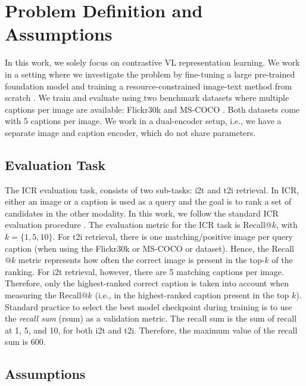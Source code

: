 
\section{Problem Definition and Assumptions}
\label{appendix:problem}

In this work, we solely focus on contrastive \ac{VL} representation learning. 
We work in a setting where we investigate the problem by fine-tuning a large pre-trained foundation model \citep[CLIP,][]{radford2021learning} and training a resource-constrained image-text method from scratch \citep[VSE++,][]{faghri2018improving}.
We train and evaluate using two benchmark datasets where multiple captions per image are available: \acl{Flickr30k} \citep{young2014image} and \acl{MS-COCO} \citep{lin2014microsoft}. 
Both datasets come with 5 captions per image.
We work in a dual-encoder setup, i.e., we have a separate image and caption encoder, which do not share parameters.

\subsection{Evaluation Task}
\label{appendix:task}

The \acf{ICR} evaluation task, consists of two sub-tasks: \acf{i2t} and \acf{t2i} retrieval.
In \ac{ICR}, either an image or a caption is used as  a query and the goal is to rank a set of candidates in the other modality.
In this work, we follow the standard \ac{ICR} evaluation procedure \citep[see, e.g.,][]{faghri2018improving, lee2018stacked, li2019visual}.
The evaluation metric for the \ac{ICR} task is Recall$@k$, with $k=\{1, 5, 10\}$.
For \ac{t2i} retrieval, there is one matching/positive image per query caption (when using the \ac{Flickr30k} or \ac{MS-COCO} or dataset). 
Hence, the Recall$@k$ metric represents how often the correct image is present in the top-$k$ of the ranking. 
For \ac{i2t} retrieval, however, there are 5 matching captions per image. 
Therefore, only the highest-ranked correct caption is taken into account when measuring the Recall$@k$ (i.e., in the highest-ranked caption present in the top $k$).
Standard practice to select the best model checkpoint during training is to use the \emph{recall sum} (rsum) as a validation metric. 
The recall sum is the sum of recall at 1, 5, and 10, for both \ac{i2t} and \ac{t2i}.
Therefore, the maximum value of the recall sum is 600. 

\subsection{Assumptions}
\label{app:assumptions}

